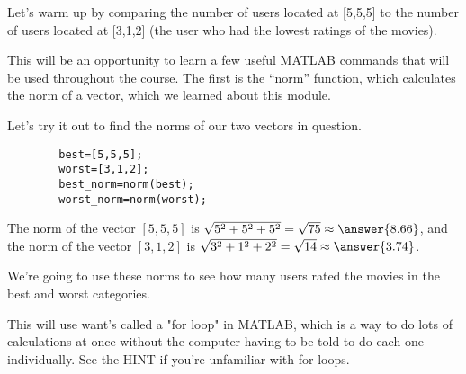 \documentclass{ximera}
\begin{document}
  \begin{exploration}
  
 Let's warm up by comparing the number of users located at [5,5,5] to the number of users located at [3,1,2] (the user who had the lowest ratings of the movies).

  This will be an opportunity to learn a few useful MATLAB commands that will be used throughout the course. The first is the ``norm'' function, which calculates the norm of a vector, which we learned about this module.

  Let's try it out to find the norms of our two vectors in question. 

  \begin{remark}
    \begin{verbatim}
        best=[5,5,5];
        worst=[3,1,2];
        best_norm=norm(best);
        worst_norm=norm(worst);
    \end{verbatim}
  \end{remark}

  \begin{example}

    The norm of the vector $[5,5,5]$ is $\sqrt{5^2+5^2+5^2}=\sqrt{75}\approx \answer{8.66}$, and the norm of the vector $[3,1,2]$ is $\sqrt{3^2+1^2+2^2}=\sqrt{14}\approx \answer{3.74}$.

  \end{example}

  We're going to use these norms to see how many users rated the movies in the best and worst categories. 
  
  This will use want's called a "for loop" in MATLAB, which is a way to do lots of calculations at once without the computer having to be told to do each one individually. See the HINT if you're unfamiliar with for loops.

\end{exploration}
\end{document}
